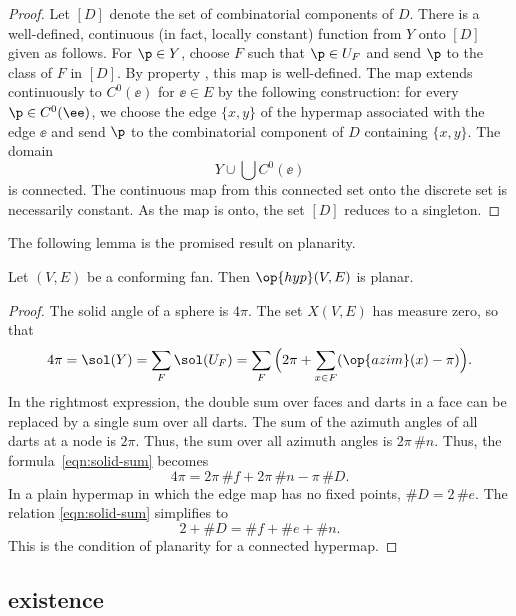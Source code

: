\begin{proof} Let $[D]$ denote the set of combinatorial components of
  $D$.  There is a well-defined, continuous (in fact, locally
  constant) function from $Y$ onto $[D]$ given as follows.  For $\p\in
  Y$, choose $F$ such that $\p\in U_F$ and send $\p$ to the class of
  $F$ in $[D]$.  By property , this map is
  well-defined.  The map extends continuously to $C^0(\ee)$ for
  $\ee\in E$ by the following construction: for every $\p\in
  C^0(\ee)$, we choose the edge $\{x,y\}$ of the hypermap associated
  with the edge $\ee$ and send $\p$ to the combinatorial component of
  $D$ containing $\{x,y\}$. The domain
\[ 
Y\cup \bigcup C^0(\ee)
\] 
is connected.  The continuous map from this connected set onto the
discrete set is necessarily constant.  As the map is onto, the set
$[D]$ reduces to a singleton.
\end{proof}

The following lemma is the promised result on planarity.

\begin{lemma}[]  
\label{lemma:cfplanar}
Let $(V,E)$ be a conforming fan.  
Then $\op{hyp}(V,E)$ is planar.
\end{lemma}
%
%

\begin{proof}  The solid angle of a sphere is $4\pi$.  The set $X(V,E)$
has measure zero, so that
\begin{equation}\label{eqn:solid-sum}
4\pi = \sol(Y)= \sum_F \sol(U_F) = 
\sum_F \Big( 2\pi + \sum_{x\in F} (\op{azim}(x)-\pi) \Big).
\end{equation}
In the rightmost expression, the double sum over faces and darts in a
face can be replaced by a single sum over all darts.  The sum of the
azimuth angles of all darts at a node is $2\pi$. Thus, the sum over all azimuth
angles is $2\pi\,\#n$.  Thus, the formula~\eqref{eqn:solid-sum}
becomes
\[ 
4\pi = 2\pi\, \#f +2\pi\,\#n - \pi\, \#D.
\] 
In a plain hypermap in which the edge map has no fixed points, $\#D =
2\,\#e$.  The relation \eqref{eqn:solid-sum} simplifies to
\[ 
2 + \#D = \#f + \#e + \#n.
\] 
This is the condition of planarity for a connected hypermap.
\end{proof}
%

\subsection{existence}




